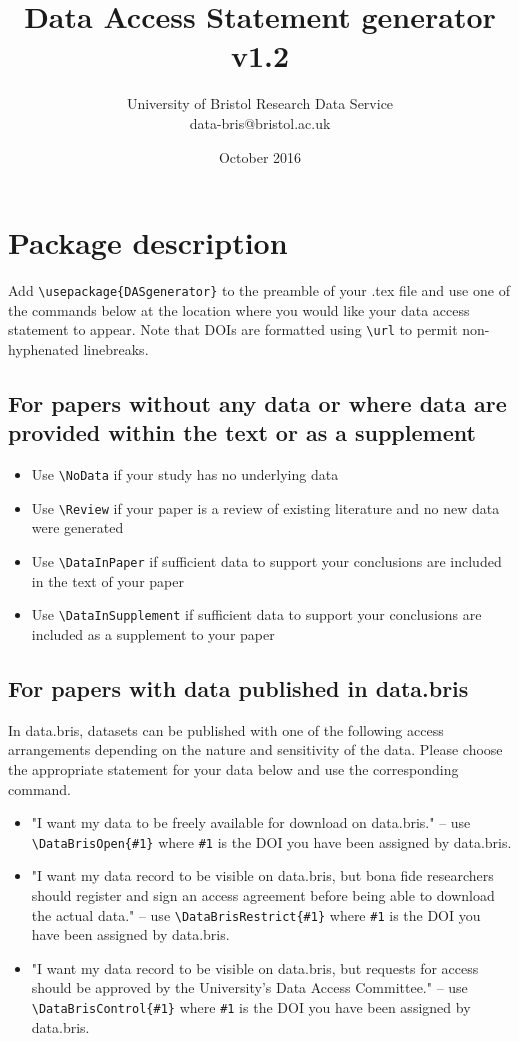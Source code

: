 \documentclass{article}
\title{Data Access Statement generator v1.2}
\author{University of Bristol Research Data Service \\ data-bris@bristol.ac.uk}
\date{October 2016}
\begin{document}
\maketitle

\section{Package description}
Add \verb|\usepackage{DASgenerator}| to the preamble of your .tex file and use one of the commands below at the location where you would like your data access statement to appear.  Note that DOIs are formatted using \verb|\url| to permit non-hyphenated linebreaks.

\subsection{For papers without any data or where data are provided within the text or as a supplement}
\begin{itemize}
    \item Use \verb|\NoData| if your study has no underlying data
    \item Use \verb|\Review| if your paper is a review of existing literature and no new data were generated
    \item Use \verb|\DataInPaper| if sufficient data to support your conclusions are included in the text of your paper
    \item Use \verb|\DataInSupplement| if sufficient data to support your conclusions are included as a supplement to your paper
\end{itemize}

\subsection{For papers with data published in data.bris}
In data.bris, datasets can be published with one of the following access arrangements depending on the nature and sensitivity of the data. Please choose the appropriate statement for your data below and use the corresponding command.

\begin{itemize}
    \item "I want my data to be freely available for download on data.bris." -- use \verb|\DataBrisOpen{#1}| where \verb|#1| is the DOI you have been assigned by data.bris.
    \item "I want my data record to be visible on data.bris, but bona fide researchers should register and sign an access agreement before being able to download the actual data." -- use \verb|\DataBrisRestrict{#1}| where \verb|#1| is the DOI you have been assigned by data.bris.
    \item "I want my data record to be visible on data.bris, but requests for access should be approved by the University's Data Access Committee." -- use \verb|\DataBrisControl{#1}| where \verb|#1| is the DOI you have been assigned by data.bris.
\end{itemize}
\end{document}

